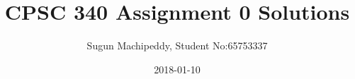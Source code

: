 \documentclass{article}
\def\rubric#1{\gre{Rubric: \{#1\}}}{}
\def\blu#1{{\color{blu}#1}}
\def\gre#1{{\color{gre}#1}}
\begin{document}
\title{CPSC 340 Assignment 0 Solutions}
\author{Sugun Machipeddy, Student No:65753337}
\date{2018-01-10}
\maketitle

\vspace{10pt}
\begin{comment}
\emph{Rationale for Assignment 0}: CPSC 340 is tough because it combines knowledge and skills across several disciplines. To succeed
in the course, you will need:
\begin{itemize}
\item Basic Python programming, including NumPy and plotting with matplotlib.
\item Math to the level of the course prerequisites: linear algebra, multivariable calculus, some probability.
\item Statistics, algorithms and data structures to the level of the course prerequisites.
\item Some basic LaTeX and git skills so that you can typeset equations and submit your assignments.
\end{itemize}

The purpose of this assignment is to make sure you are prepared for this course. I anticipate that each
of you will have different strengths and weaknesses, so don't be worried if you struggle with \emph{some} aspects
of the assignment. But if you find this assignment
to be very difficult overall, that is an early warning sign that you may not be prepared to take CPSC 340
at this time. Future assignments will be longer and more difficult than this one.


\section*{Instructions}
\rubric{mechanics:3}

\textbf{IMPORTANT!!!!! Before proceeding, please carefully read the general homework instructions at} \url{https://github.ugrad.cs.ubc.ca/CPSC340-2017W-T2/home/blob/master/homework_instructions.md}.
You need to be signed in to github.ugrad.cs.ubc.ca (using your CS ugrad id) in order to view this file. 


\vspace{1em}
We use \blu{blue} to highlight the deliverables that you must answer/do/submit with the assignment.

\end{comment}
\end{document}
